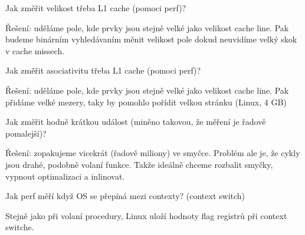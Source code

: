 \begin{exercise}
	Jak změřit velikost třeba L1 cache (pomoci perf)?

	Řešení: uděláme pole, kde prvky jsou stejně velké jako velikost cache line.
	Pak budeme binárním vyhledávaním měnit velikost pole dokud neuvidíme velký skok v cache missech.
\end{exercise}

\begin{exercise}
	Jak změřit asociativitu třeba L1 cache (pomoci perf)?

	Řešení: uděláme pole, kde prvky jsou stejně velké jako velikost cache line.
	Pak přidáme velké mezery, taky by pomohlo pořídit velkou stránku (Linux, 4 GB)
\end{exercise}

\begin{exercise}
	Jak změřit hodně krátkou událost (miněno takovou, že měření je řadově pomalejší)?

	Řešení: zopakujeme vicekrát (řadově miliony) ve smyčce.
	Problém ale je, že cykly jsou drahé, podobně volaní funkce.
	Takže ideálně chceme rozbalit smyčky, vypnout optimalizaci a inlinovat.
\end{exercise}

\begin{note}
	Jak perf měří když OS se přepíná mezi contexty? (context switch)

	Stejně jako při volaní procedury, Linux uloží hodnoty flag registrů při context switche.
\end{note}

